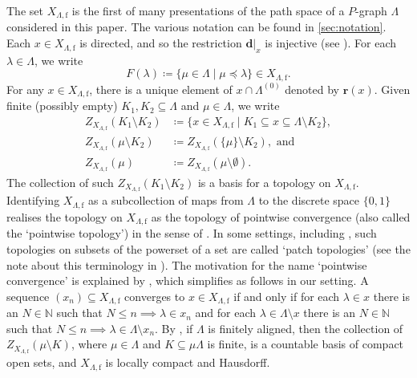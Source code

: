 \documentclass[11pt]{amsart}
\theoremstyle{definition}
\numberwithin{thm}{section}
\numberwithin{equation}{section}
\newcommand{\setof}[2]{\{ #1 \mid #2 \}}
\newcommand{\range}{\mathbf{r}}
\newcommand{\degree}{\mathbf{d}}
\newcommand{\principal}[1]{F(#1)}
\newcommand{\F}{\mathrm{f}}
\newcommand{\PS}[2]{X_{#2, #1}}
\newcommand{\Fell}[3]{Z_{#1}\left(#2 \setminus #3\right)}
\newcommand{\Fellin}[2]{Z_{#1}\left(#2\right)}
\begin{document}
The set $\PS{\F}{\Lambda}$ is the first of many presentations of the path 
space of a $P$-graph $\Lambda$ considered in this paper. 
The various notation can be found in \cref{sec:notation}.
Each $x \in \PS{\F}{\Lambda}$ is directed, and so the restriction $\degree|_x$ is 
injective (see \cite[Lemma 6.6(b)]{RW17}).
For each $\lambda \in \Lambda$, we write 
\[
\principal{\lambda} \coloneqq \setof{
\mu \in \Lambda
}{
\mu \preceq \lambda
} \in \PS{\F}{\Lambda}.
\]
For any $x \in \PS{\F}{\Lambda}$, there is a unique element of $x \cap \Lambda^{(0)}$ denoted by $\range(x)$.
Given finite (possibly empty) $K_1, K_2 \subseteq \Lambda$ and $\mu \in \Lambda$, we write
\begin{align*}
\Fell{\PS{\F}{\Lambda}}{K_1}{K_2}
&\coloneqq \setof{
x \in \PS{\F}{\Lambda}
}{
K_1 \subseteq x \subseteq \Lambda \setminus K_2
}, \\
\Fell{\PS{\F}{\Lambda}}{\mu}{K_2}
&\coloneqq \Fell{\PS{\F}{\Lambda}}{\{\mu\}}{K_2}, \text{ and } \\
\Fellin{\PS{\F}{\Lambda}}{\mu}
&\coloneqq \Fell{\PS{\F}{\Lambda}}{\mu}{\emptyset}.
\end{align*}
The collection of such $\Fell{\PS{\F}{\Lambda}}{K_1}{K_2}$ is a basis for a topology on $\PS{\F}{\Lambda}$.
Identifying $\PS{\F}{\Lambda}$ as a subcollection of maps from $\Lambda$ to the discrete space $\{0, 1\}$ realises the topology on $\PS{\F}{\Lambda}$ as the topology of pointwise convergence (also called the `pointwise topology') in the sense of \cite[Definition 42.1]{Wil70}. 
In some settings, including \cite{ACaHJL}, such topologies on subsets of the powerset of a set are called `patch topologies' (see the note about this terminology in \cite[Page 293]{LV21}).
The motivation for the name `pointwise convergence' is explained by \cite[Theorem 42.2]{Wil70}, which simplifies as follows in our setting.
A sequence $(x_n) \subseteq \PS{\F}{\Lambda}$ converges to $x \in \PS{\F}{\Lambda}$ if and only if for each $\lambda \in x$ there is an $N \in \mathbb{N}$ such that $N \leq n \implies \lambda \in x_n$ and for each $\lambda \in \Lambda \setminus x$ there is an $N \in \mathbb{N}$ such that $N \leq n \implies \lambda \in \Lambda \setminus x_n$.
By \cite[Remark 4.2 and Theorem 4.9]{Jon26}, if $\Lambda$ is finitely aligned, then the collection of $\Fell{\PS{\F}{\Lambda}}{\mu}{K}$, where $\mu \in \Lambda$ and $K \subseteq \mu\Lambda$ is finite, is a countable basis of compact open sets, and $\PS{\F}{\Lambda}$ is locally compact and Hausdorff.
\end{document}
